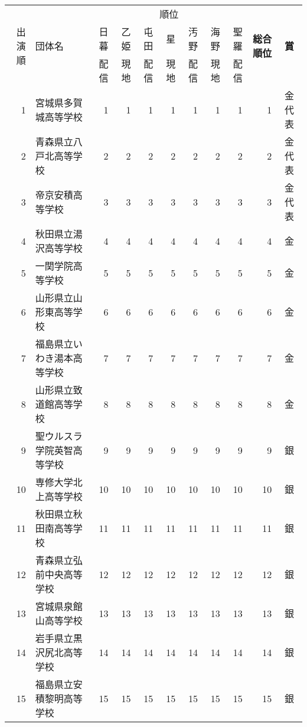 \documentclass[11pt,a4paper,landscape,twoside,openany,english,uplatex]{jsarticle}
\begin{document}
\clearpage
\begin{table}[h]
 \centering
 \begin{tabular}{r|l||rrrrrrr|r|c}
  \hline
  \multirow{3}{*}{出演順} & \multirow{3}{*}{団体名} & \multicolumn{7}{|c|}{順位} & \multirow{3}{*}{\textbf{総合順位}} &  \multirow{3}{*}{\textbf{賞}} \\
  \cline{3-9} %
    &  & 日暮 & 乙姫 & 屯田 & 星   & 汚野 & 海野 & 聖羅 & & \\
    &  & 配信 & 現地 & 配信 & 現地 & 配信 & 現地 & 配信 & &  \\
  \hline \hline
   1 & 宮城県多賀城高等学校         &   1 &  1 &  1 &  1 &  1 &  1 &  1 &  1 & 金代表 \\
   2 & 青森県立八戸北高等学校       &   2 &  2 &  2 &  2 &  2 &  2 &  2 &  2 & 金代表 \\
   3 & 帝京安積高等学校             &   3 &  3 &  3 &  3 &  3 &  3 &  3 &  3 & 金代表 \\
   4 & 秋田県立湯沢高等学校         &   4 &  4 &  4 &  4 &  4 &  4 &  4 &  4 & 金 \\
   5 & 一関学院高等学校             &   5 &  5 &  5 &  5 &  5 &  5 &  5 &  5 & 金 \\
   6 & 山形県立山形東高等学校       &   6 &  6 &  6 &  6 &  6 &  6 &  6 &  6 & 金 \\
   7 & 福島県立いわき湯本高等学校   &   7 &  7 &  7 &  7 &  7 &  7 &  7 &  7 & 金 \\
   8 & 山形県立致道館高等学校       &   8 &  8 &  8 &  8 &  8 &  8 &  8 &  8 & 金 \\
  \hline                                                                      
   9 & 聖ウルスラ学院英智高等学校   &   9 &  9 &  9 &  9 &  9 &  9 &  9 &  9 & 銀 \\
  10 & 専修大学北上高等学校         &  10 & 10 & 10 & 10 & 10 & 10 & 10 & 10 & 銀 \\
  11 & 秋田県立秋田南高等学校       &  11 & 11 & 11 & 11 & 11 & 11 & 11 & 11 & 銀 \\
  12 & 青森県立弘前中央高等学校     &  12 & 12 & 12 & 12 & 12 & 12 & 12 & 12 & 銀 \\
  13 & 宮城県泉館山高等学校         &  13 & 13 & 13 & 13 & 13 & 13 & 13 & 13 & 銀 \\
  14 & 岩手県立黒沢尻北高等学校     &  14 & 14 & 14 & 14 & 14 & 14 & 14 & 14 & 銀 \\
  15 & 福島県立安積黎明高等学校     &  15 & 15 & 15 & 15 & 15 & 15 & 15 & 15 & 銀 \\

\end{tabular}
\end{table}
\end{document}
